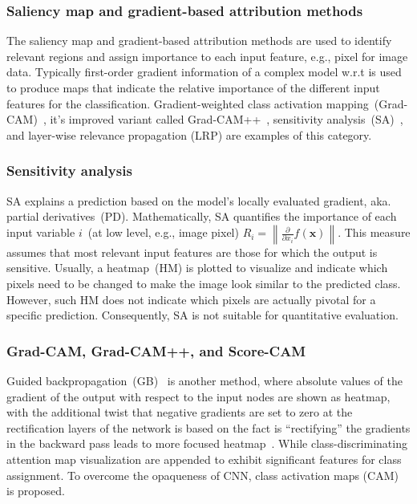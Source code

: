 \subsubsection{Saliency map and gradient-based attribution methods}
The saliency map and gradient-based attribution methods are used to identify relevant regions and assign importance to each input feature, e.g., pixel for image data. Typically first-order gradient information of a complex model w.r.t is used to produce maps that indicate the relative importance of the different input features for the classification. Gradient-weighted class activation mapping~(Grad-CAM)~\cite{selvaraju2017grad}, it's improved variant called Grad-CAM++~\cite{chattopadhay2018grad}, sensitivity analysis~(SA)~\cite{baehrens2010explain, simonyan2013deep}, and layer-wise relevance propagation (LRP) are examples of this category. 

\subsubsection{Sensitivity analysis}
SA explains a prediction based on the model's locally evaluated gradient, aka. partial derivatives~(PD). Mathematically, SA quantifies the importance of each input variable $i$~(at low level, e.g., image pixel) $R_{i}=\left\|\frac{\partial}{\partial x_{i}} f(\mathbf{x})\right\|$. This measure assumes that most relevant input features are those for which the output is sensitive. Usually, a heatmap~(HM) is plotted to visualize and indicate which pixels need to be changed to make the image look similar to the predicted class. However, such HM does not indicate which pixels are actually pivotal for a specific prediction. Consequently, SA is not suitable for quantitative evaluation. 

\subsubsection{Grad-CAM, Grad-CAM++, and Score-CAM}
Guided backpropagation~(GB)~\cite{springenberg2014striving} is another method, where absolute values of the gradient of the output with respect to the input nodes are shown as heatmap, with the additional twist that negative gradients are set to zero at the rectification layers of the network is based on the fact is ``rectifying” the gradients in the backward pass leads to more focused heatmap~\cite{bohle2019layer}. While class-discriminating attention map visualization are appended to exhibit significant features for class assignment. To overcome the opaqueness of CNN, class activation maps (CAM)~\cite{zhou2016learning} is proposed. 


